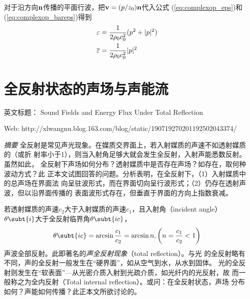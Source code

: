 \documentclass[UTF8]{ctexbook}
\begin{document}
对于沿方向$\vb{n}$传播的平面行波，把$\vb{v}=(p/z_0)\vb{n}$代入公式
(\ref{eq:complexop_eps})和(\ref{eq:complexop_bareps})得到
\begin{align*}
	\varepsilon &= \frac{1}{2\rho_0c_0^2} (p^2+|p|^2)\\
	\overline{\varepsilon} &= \frac{1}{2\rho_0c_0^2} |p|^2
\end{align*}


\section{全反射状态的声场与声能流}
英文标题：
Sound Fields and Energy Flux Under Total Reflection

Web:
http://xlwangnu.blog.163.com/blog/static/190719270201192502043374/

\emph{摘要}
全反射是常见声光现象。在媒质交界面上，若入射媒质的声速不如透射媒质的（或折
射率小于1），则当入射角足够大就会发生全反射，入射声能悉数反射。虽然如此，
全反射下声场如何分布？透射媒质中是否存在声场？如存在，取何种波动方式？此
正本文试图回答的问题。分析表明，在全反射下，（1）入射媒质中的总声场在界面法
向呈驻波形式，而在界面切向呈行波形式；（2）仍存在透射声波，但以沿界面传播的
表面波形式存在，但垂直于界面的方向上指数衰减。

若透射媒质的声速$c_2$大于入射媒质的声速$c_1$，且入射角（incident angle）
$\theta\subt{i}$大于全反射临界角$\theta\subt{ic}$，
\begin{equation}
\theta\subt{ic} = \arcsin \frac{c_1}{c_2} = \arcsin n, \qty(n=\frac{c_1}{c_2}
<1)
\end{equation}
声波全部反射。此即著名的\emph{声全反射现象}（total reflection）。与光
的全反射略有不同，声的全反射一般发生在“硬界面”，如从空气到水，从水到固体。
光的全反射则发生在“软表面”---从光密介质入射到光疏介质，如光纤内的光反射，故
而一般称之为全内反射（Total internal reflection）。或问：在全反射状态，声场
分布如何？声能如何传播？此正本文所欲讨论的。
\end{document}
